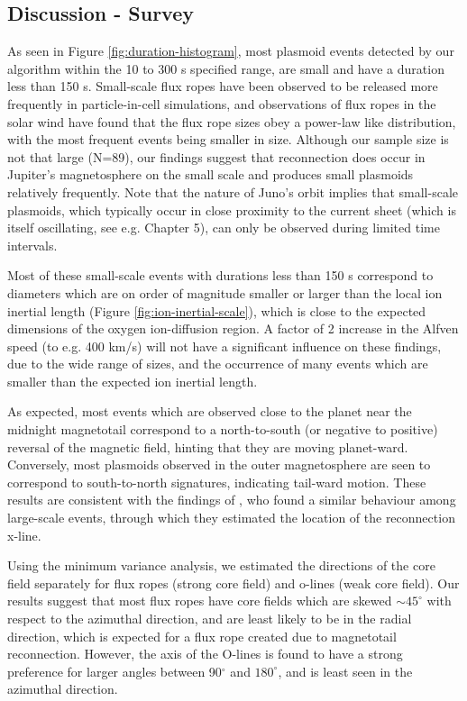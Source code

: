 \subsection{Discussion - Survey}

As seen in Figure \ref{fig:duration-histogram}, most plasmoid events detected by our algorithm within the 10 to 300 s specified range, are small and have a duration less than 150 s. Small-scale flux ropes have been observed to be released more frequently in particle-in-cell simulations, and observations of flux ropes in the solar wind have found that the flux rope sizes obey a power-law like distribution, with the most frequent events being smaller in size. Although our sample size is not that large (N=89), our findings suggest that reconnection does occur in Jupiter's magnetosphere on the small scale and produces small plasmoids relatively frequently. Note that the nature of Juno's orbit implies that small-scale plasmoids, which typically occur in close proximity to the current sheet (which is itself oscillating, see e.g. Chapter 5), can only be observed during limited time intervals.

Most of these small-scale events with durations less than 150 s correspond to diameters which are on order of magnitude smaller or larger than the local ion inertial length (Figure \ref{fig:ion-inertial-scale}), which is close to the expected dimensions of the oxygen ion-diffusion region. A factor of 2 increase in the Alfven speed (to e.g. 400 km/s) will not have a significant influence on these findings, due to the wide range of sizes, and the occurrence of many events which are smaller than the expected ion inertial length. 

As expected, most events which are observed close to the planet near the midnight magnetotail correspond to a north-to-south (or negative to positive) reversal of the magnetic field, hinting that they are moving planet-ward. Conversely, most plasmoids observed in the outer magnetosphere are seen to correspond to south-to-north signatures, indicating tail-ward motion. These results are consistent with the findings of , who found a similar behaviour among large-scale events, through which they estimated the location of the reconnection x-line. 

Using the minimum variance analysis, we estimated the directions of the core field separately for flux ropes (strong core field) and o-lines (weak core field). Our results suggest that most flux ropes have core fields which are skewed $\sim45^\circ$ with respect to the azimuthal direction, and are least likely to be in the radial direction, which is expected for a flux rope created due to magnetotail reconnection. However, the axis of the O-lines is found to have a strong preference for larger angles between 90$^\circ$ and $180^\circ$, and is least seen in the azimuthal direction. 

